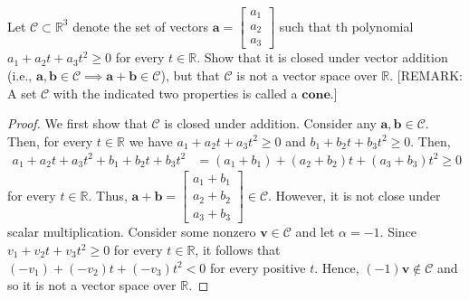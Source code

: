 \documentclass[12pt]{article}
\newcommand{\R}{\mathbb{R}}
\newenvironment{problem}[2][Problem]{\begin{trivlist} \item[\hskip \labelsep {\bfseries #1}\hskip \labelsep {\bfseries #2.}]}{\end{trivlist}}
\begin{document}
    \begin{problem}{1.3}
      Let $\mathcal{C}\subset \R^{3}$ denote the set of vectors $\mathbf{a} = \begin{bmatrix} a_{1}\\ a_{2}\\ a_{3}\end{bmatrix}$ such that th polynomial $a_{1} + a_{2}t + a_{3}t^{2} \geq 0$ for every $t\in \R$. Show that it is closed under vector addition (i.e., $\mathbf{a},\mathbf{b} \in \mathcal{C} \implies \mathbf{a}+\mathbf{b} \in \mathcal{C}$), but that $\mathcal{C}$ is not a vector space over $\R$. [REMARK: A set $\mathcal{C}$ with the indicated two properties is called a $\mathbf{cone}$.]
    \begin{proof}
      We first show that $\mathcal{C}$ is closed under addition. Consider any $\mathbf{a}, \mathbf{b}\in \mathcal{C}$. Then, for every $t\in \R$ we have $a_{1} + a_{2}t + a_{3}t^{2} \geq 0$ and $b_{1}+b_{2}t+b_{3}t^{2}\geq 0$. Then, 
    \begin{align*}
      a_{1} + a_{2}t + a_{3}t^{2} + b_{1}+b_{2}t+b_{3}t^{2} &= (a_{1} + b_{1}) + (a_{2} + b_{2})t + (a_{3}+b_{3})t^{2} \geq 0
    \end{align*}
    for every $t\in \R$. Thus, $\mathbf{a} + \mathbf{b} = \begin{bmatrix} a_{1}+b_{1}\\ a_{2} + b_{2}\\ a_{3}+b_{3} \end{bmatrix} \in \mathcal{C}$. However, it is not close under scalar multiplication. Consider some nonzero $\mathbf{v} \in \mathcal{C}$ and let $\alpha = -1$. Since $v_{1} + v_{2}t + v_{3}t^{2} \geq 0$ for every $t\in \R$, it follows that $(-v_{1}) + (-v_{2})t + (-v_{3})t^{2}<0$ for every positive $t$. Hence, $(-1)\mathbf{v} \not\in \mathcal{C}$ and so it is not a vector space over $\R$.
    \end{proof}
    \end{problem}
\end{document}
